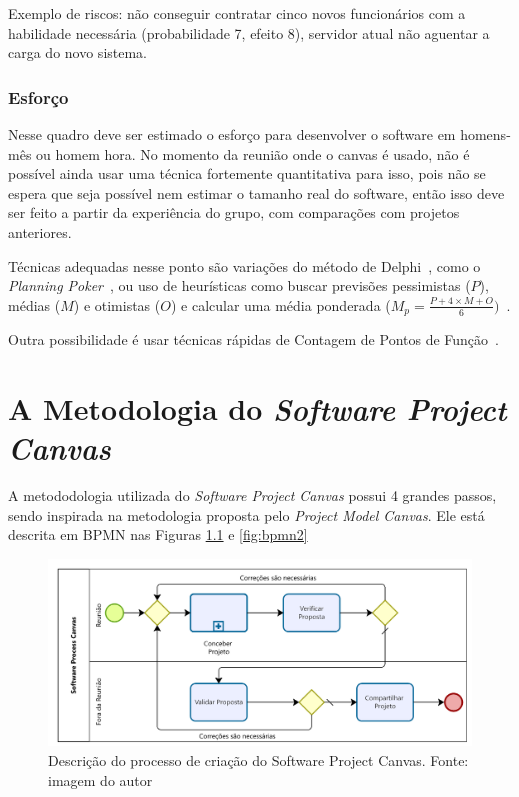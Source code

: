 \documentclass[fontsize=12pt, a4paper,pagesize=auto,toc=listof, ,twoside,chapterprefix=false,appendixprefix=true,open=right]{scrbook}
\begin{document}
Exemplo de riscos: não conseguir contratar cinco novos funcionários com a habilidade necessária (probabilidade 7, efeito 8), servidor atual não aguentar a carga do novo sistema.

\subsection{Esforço}

Nesse quadro deve ser estimado o esforço para desenvolver o software em homens-mês ou homem hora.
 No momento da reunião onde o canvas é usado, não é possível ainda usar uma técnica fortemente quantitativa para isso, pois não se espera que seja possível nem estimar o tamanho real do software, então isso deve ser feito a partir da experiência do grupo, com comparações com projetos anteriores.

Técnicas adequadas nesse ponto são variações do método de Delphi~\citep{delphi:1966}, como o \textit{Planning Poker}~\citep{mike:agile:estimating}, ou uso de heurísticas como buscar previsões pessimistas ($P$), médias ($M$) e otimistas ($O$) e calcular uma média ponderada ($M_p=\frac{P+4\times M+O}{6})$~\citep{pmbok:6}.

Outra possibilidade é usar técnicas rápidas de Contagem de Pontos de Função~\citep{ifpug:FPM:431}.

\chapter{A Metodologia do \textit{Software Project Canvas}}

A metododologia utilizada do \textit{Software Project Canvas} possui 4 grandes passos, sendo inspirada na metodologia proposta pelo \textit{Project Model Canvas}.
 Ele está descrita em BPMN nas Figuras \ref{fig:bpmn1} e \ref{fig:bpmn2}

\begin{figure}[tbh]
\centering
\includegraphics[width=\textwidth]{"Modelos/Software Project Canvas BPMN Bizagi"}
\caption{Descrição do processo de criação do Software Project Canvas. Fonte: imagem do autor}
\label{fig:bpmn1}
\end{figure}
\end{document}
